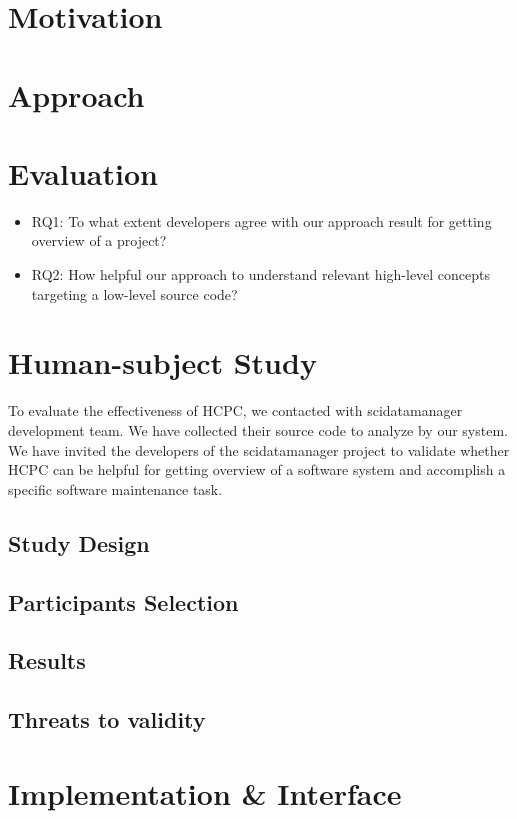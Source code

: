 \section{Motivation}

\section{Approach}

\section{Evaluation}

\begin{itemize}
    \item RQ1: To what extent developers agree with our approach result for getting overview of a project?
    \item RQ2: How helpful our approach to understand relevant high-level concepts targeting a low-level source code?
\end{itemize}

\section{Human-subject Study}
To evaluate the effectiveness of HCPC, we contacted with scidatamanager development team. We have collected their source code to analyze by our system. We have invited the developers of the scidatamanager project to validate whether HCPC can be helpful for getting overview of a software system and accomplish a specific software maintenance task.
\subsection{Study Design}

\subsection{Participants Selection}

\subsection{Results}

\subsection{Threats to validity}

\section{Implementation \& Interface}


